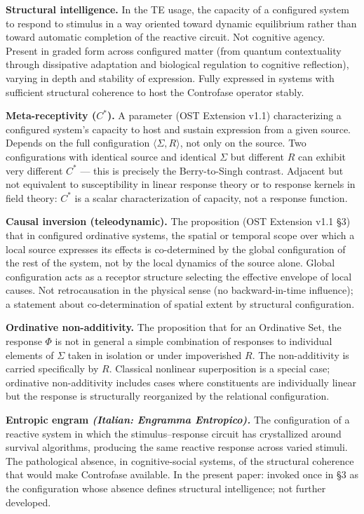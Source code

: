 \documentclass[
  11pt,
  a4paper,
]{article}
\begin{document}
\textbf{Structural intelligence.} In the TE usage, the capacity of a
configured system to respond to stimulus in a way oriented toward
dynamic equilibrium rather than toward automatic completion of the
reactive circuit. Not cognitive agency. Present in graded form across
configured matter (from quantum contextuality through dissipative
adaptation and biological regulation to cognitive reflection), varying
in depth and stability of expression. Fully expressed in systems with
sufficient structural coherence to host the Controfase operator stably.

\textbf{Meta-receptivity (\(C^*\)).} A parameter (OST Extension v1.1)
characterizing a configured system's capacity to host and sustain
expression from a given source. Depends on the full configuration
\(\langle \Sigma, R \rangle\), not only on the source. Two
configurations with identical source and identical \(\Sigma\) but
different \(R\) can exhibit very different \(C^*\) --- this is precisely
the Berry-to-Singh contrast. Adjacent but not equivalent to
susceptibility in linear response theory or to response kernels in field
theory: \(C^*\) is a scalar characterization of capacity, not a response
function.

\textbf{Causal inversion (teleodynamic).} The proposition (OST Extension
v1.1 §3) that in configured ordinative systems, the spatial or temporal
scope over which a local source expresses its effects is co-determined
by the global configuration of the rest of the system, not by the local
dynamics of the source alone. Global configuration acts as a receptor
structure selecting the effective envelope of local causes. Not
retrocausation in the physical sense (no backward-in-time influence); a
statement about co-determination of spatial extent by structural
configuration.

\textbf{Ordinative non-additivity.} The proposition that for an
Ordinative Set, the response \(\Phi\) is not in general a simple
combination of responses to individual elements of \(\Sigma\) taken in
isolation or under impoverished \(R\). The non-additivity is carried
specifically by \(R\). Classical nonlinear superposition is a special
case; ordinative non-additivity includes cases where constituents are
individually linear but the response is structurally reorganized by the
relational configuration.

\textbf{Entropic engram \emph{(Italian: Engramma Entropico).}} The
configuration of a reactive system in which the stimulus--response
circuit has crystallized around survival algorithms, producing the same
reactive response across varied stimuli. The pathological absence, in
cognitive-social systems, of the structural coherence that would make
Controfase available. In the present paper: invoked once in §3 as the
configuration whose absence defines structural intelligence; not further
developed.
\end{document}
